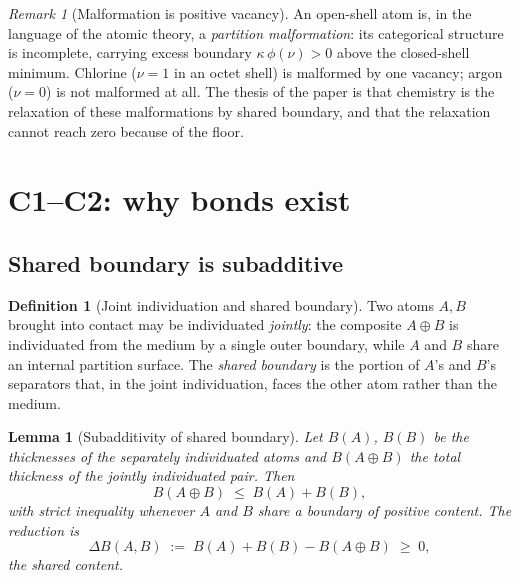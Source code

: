 \documentclass[11pt,a4paper]{article}
\theoremstyle{thmstyle}
\newtheorem{lemma}[theorem]{Lemma}
\theoremstyle{definition}
\newtheorem{definition}[theorem]{Definition}
\theoremstyle{remark}
\newtheorem{remark}[theorem]{Remark}
\newcommand{\thick}{B}                 %
\newcommand{\vac}{\nu}                 %
\begin{document}
\begin{remark}[Malformation is positive vacancy]
\label{rem:malformation}
An open-shell atom is, in the language of the atomic theory, a
\emph{partition malformation}: its categorical structure is incomplete,
carrying excess boundary $\kappa\,\phi(\vac)>0$ above the closed-shell
minimum. Chlorine ($\vac=1$ in an octet shell) is malformed by one
vacancy; argon ($\vac=0$) is not malformed at all. The thesis of the
paper is that chemistry is the relaxation of these malformations by
shared boundary, and that the relaxation cannot reach zero because of the
floor.
\end{remark}

\section{C1--C2: why bonds exist}
\label{sec:bond}

\subsection{Shared boundary is subadditive}

\begin{definition}[Joint individuation and shared boundary]
\label{def:joint}
Two atoms $A,B$ brought into contact may be individuated \emph{jointly}:
the composite $A\!\oplus\!B$ is individuated from the medium by a single
outer boundary, while $A$ and $B$ share an internal partition surface.
The \emph{shared boundary} is the portion of $A$'s and $B$'s separators
that, in the joint individuation, faces the other atom rather than the
medium.
\end{definition}

\begin{lemma}[Subadditivity of shared boundary]
\label{lem:subadditive}
Let $\thick(A)$, $\thick(B)$ be the thicknesses of the separately
individuated atoms and $\thick(A\!\oplus\!B)$ the total thickness of the
jointly individuated pair. Then
\[
\thick(A\!\oplus\!B)\;\le\;\thick(A)+\thick(B),
\]
with strict inequality whenever $A$ and $B$ share a boundary of positive
content. The reduction is
\[
\Delta\thick(A,B)\;:=\;\thick(A)+\thick(B)-\thick(A\!\oplus\!B)\;\ge\;0,
\]
the \emph{shared content}.
\end{lemma}
\end{document}
